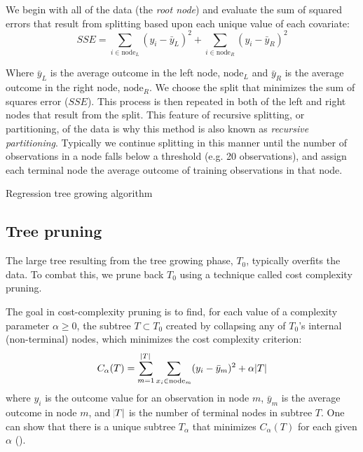 \documentclass[12pt]{article}
\begin{document}
We begin with all of the data (the \emph{root node}) and evaluate the sum of squared errors that result from splitting based upon each unique value of each covariate:
\begin{equation}
  SSE = \sum_{i \in \text{node}_{L}} (y_{i} - \bar{y}_{L})^2 + \sum_{i \in \text{node}_{R}} (y_{i} - \bar{y}_{R})^2
\end{equation}

Where $\bar{y}_{L}$ is the average outcome in the left node, $\text{node}_{L}$ and $\bar{y}_{R}$ is the average outcome in the right node, $\text{node}_{R}$. We choose the split that minimizes the sum of squares error ($SSE$). This process is then repeated in both of the left and right nodes that result from the split. This feature of recursive splitting, or partitioning, of the data is why this method is also known as \emph{recursive partitioning}. Typically we continue splitting in this manner until the number of observations in a node falls below a threshold (e.g. 20 observations), and assign each terminal node the average outcome of training observations in that node.

\begin{algorithm}[!htbp]
 \caption{Regression tree growing algorithm}
\end{algorithm}


\subsection{Tree pruning} %
\label{sub:tree_pruning}

The large tree resulting from the tree growing phase, $T_{0}$, typically overfits the data. To combat this, we prune back $T_{0}$ using a technique called cost complexity pruning.

The goal in cost-complexity pruning is to find, for each value of a complexity parameter $\alpha \geq 0$, the subtree $T \subset T_{0}$ created by collapsing any of $T_{0}$'s internal (non-terminal) nodes, which minimizes the cost complexity criterion:
%
\begin{equation}
    C_{\alpha}(T) = \sum_{m = 1}^{\abs{T}} \sum_{x_{i} \in \text{node}_{m}} (y_{i} - \bar{y}_{m})^2 + \alpha \abs{T}
\end{equation}
%
where $y_{i}$ is the outcome value for an observation in node $m$, $\bar{y}_{m}$ is the average outcome in node $m$, and $\abs{T}$ is the number of terminal nodes in subtree $T$. One can show that there is a unique subtree $T_{\alpha}$ that minimizes $C_{\alpha}(T)$ for each given $\alpha$ (\cite{esl}).
\end{document}
